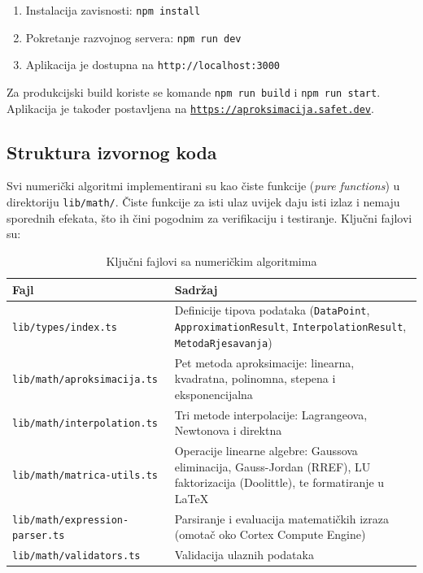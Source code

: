 \documentclass[12pt, a4paper]{article}
\begin{document}
\begin{enumerate}
    \item Instalacija zavisnosti: \texttt{npm install}
    \item Pokretanje razvojnog servera: \texttt{npm run dev}
    \item Aplikacija je dostupna na \texttt{http://localhost:3000}
\end{enumerate}

Za produkcijski build koriste se komande \texttt{npm run build} i
\texttt{npm run start}. Aplikacija je također postavljena na
\href{https://aproksimacija.safet.dev}{\texttt{https://aproksimacija.safet.dev}}.

\subsection{Struktura izvornog koda}

Svi numerički algoritmi implementirani su kao čiste funkcije (\textit{pure functions})
u direktoriju \texttt{lib/math/}. Čiste funkcije za isti ulaz uvijek daju isti
izlaz i nemaju sporednih efekata, što ih čini pogodnim za verifikaciju i
testiranje. Ključni fajlovi su:

\begin{table}[H]
    \centering
    \begin{tabular}{|l|p{9cm}|}
        \hline
        \textbf{Fajl} & \textbf{Sadržaj} \\
        \hline
        \texttt{lib/types/index.ts} & Definicije tipova podataka (\texttt{DataPoint}, \texttt{ApproximationResult}, \texttt{InterpolationResult}, \texttt{MetodaRjesavanja}) \\
        \hline
        \texttt{lib/math/aproksimacija.ts} & Pet metoda aproksimacije: linearna, kvadratna, polinomna, stepena i eksponencijalna \\
        \hline
        \texttt{lib/math/interpolation.ts} & Tri metode interpolacije: Lagrangeova, Newtonova i direktna \\
        \hline
        \texttt{lib/math/matrica-utils.ts} & Operacije linearne algebre: Gaussova eliminacija, Gauss-Jordan (RREF), LU faktorizacija (Doolittle), te formatiranje u LaTeX \\
        \hline
        \texttt{lib/math/expression-parser.ts} & Parsiranje i evaluacija matematičkih izraza (omotač oko Cortex Compute Engine) \\
        \hline
        \texttt{lib/math/validators.ts} & Validacija ulaznih podataka \\
        \hline
    \end{tabular}
    \caption{Ključni fajlovi sa numeričkim algoritmima}
\end{table}
\end{document}
